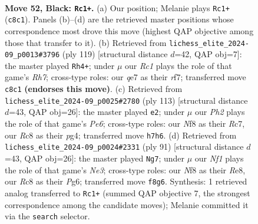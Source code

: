 \documentclass[11pt]{article}
\begin{document}
\clearpage

\begin{figure}[p]\centering
\begin{subfigure}{0.46\textwidth}\centering
\resizebox{\linewidth}{!}{%
\newchessgame
\chessboard[
  setfen={2r2nk1/1p2Q2p/8/5N1p/8/8/5R2/7K b - - 0 52},
  showmover=false,
  pgfstyle=straightmove, color=movearrow, markmove={c8-c1}
]}
\caption{}
\end{subfigure}\hfill
\begin{subfigure}{0.46\textwidth}\centering
\resizebox{\linewidth}{!}{%
\newchessgame
\chessboard[
  setfen={8/5R1p/2k5/2n1P3/2K5/1p2N3/7r/8 b - - 5 60},
  showmover=false,
  pgfstyle=straightmove, color=movearrow, markmove={h2-h4}
]}
\caption{}
\end{subfigure}
\\[4pt]
\begin{subfigure}{0.46\textwidth}\centering
\resizebox{\linewidth}{!}{%
\newchessgame
\chessboard[
  setfen={2k5/2r5/1Qn5/8/6P1/4p3/6K1/1R6 b - - 0 57},
  showmover=false,
  pgfstyle=straightmove, color=movearrow, markmove={e3-e2}
]}
\caption{}
\end{subfigure}\hfill
\begin{subfigure}{0.46\textwidth}\centering
\resizebox{\linewidth}{!}{%
\newchessgame
\chessboard[
  setfen={4r1k1/3Q3p/4n1p1/1p3p2/8/7P/6K1/3R4 b - - 2 46},
  showmover=false,
  pgfstyle=straightmove, color=movearrow, markmove={e6-g7}
]}
\caption{}
\end{subfigure}
\caption{\textbf{Move 52, Black: \texttt{Rc1+}.} (a) Our position; Melanie plays \texttt{Rc1+} (\texttt{c8c1}). Panels (b)--(d) are the retrieved master positions whose correspondence most drove this move (highest QAP objective among those that transfer to it). (b) Retrieved from \texttt{lichess\_elite\_2024-09\_p0013\#3796} (ply 119) [structural distance $d$=42, QAP obj=7]: the master played \texttt{Rh4+}; under $\mu$ our \emph{Rc1} plays the role of that game's \emph{Rh7}; cross-type roles: our \emph{q}e7 as their \emph{r}f7; transferred move \texttt{c8c1} \textbf{(endorses this move)}. (c) Retrieved from \texttt{lichess\_elite\_2024-09\_p0025\#2780} (ply 113) [structural distance $d$=43, QAP obj=26]: the master played \texttt{e2}; under $\mu$ our \emph{Ph2} plays the role of that game's \emph{Pe6}; cross-type roles: our \emph{N}f8 as their \emph{R}c7, our \emph{R}c8 as their \emph{p}g4; transferred move \texttt{h7h6}. (d) Retrieved from \texttt{lichess\_elite\_2024-09\_p0024\#2331} (ply 91) [structural distance $d$=43, QAP obj=26]: the master played \texttt{Ng7}; under $\mu$ our \emph{Nf1} plays the role of that game's \emph{Ne3}; cross-type roles: our \emph{N}f8 as their \emph{R}e8, our \emph{R}c8 as their \emph{P}g6; transferred move \texttt{f8g6}. Synthesis: 1 retrieved analog transferred to \texttt{Rc1+} (summed QAP objective 7, the strongest correspondence among the candidate moves); Melanie committed it via the \texttt{search} selector.}
\label{fig:thought-m103}
\end{figure}
\end{document}

